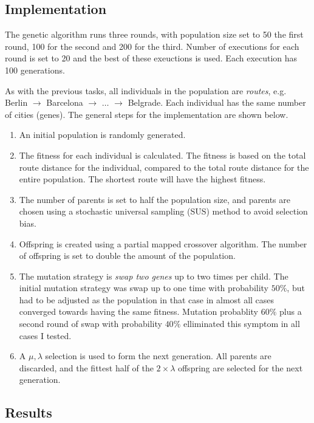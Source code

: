 \documentclass{article}
\begin{document}
\subsection*{Implementation}

The genetic algorithm runs three rounds, with population size set to 50 the first round, 100 for the second and 200 for the third. Number of executions for each round is set to 20 and the best of these exeuctions is used. Each execution has 100 generations.

As with the previous tasks, all individuals in the population are \textit{routes}, e.g. Berlin $\rightarrow$ Barcelona $\rightarrow$ $\ldots$ $\rightarrow$ Belgrade. Each individual has the same number of cities (genes). The general steps for the implementation are shown below.

\begin{enumerate}
    \item An initial population is randomly generated.
    \item The fitness for each individual is calculated. The fitness is based on the total route distance for the individual, compared to the total route distance for the entire population. The shortest route will have the highest fitness.
    \item The number of parents is set to half the population size, and parents are chosen using a stochastic universal sampling (SUS) method to avoid selection bias.
    \item Offspring is created using a partial mapped crossover algorithm. The number of offspring is set to double the amount of the population.
    \item The mutation strategy is \textit{swap two genes} up to two times per child. The initial mutation strategy was swap up to one time with probability $50\%$, but had to be adjusted as the population in that case in almost all cases converged towards having the same fitness. Mutation probablity $60\%$ plus a second round of swap with probability $40\%$ elliminated this symptom in all cases I tested.
    \item A $\mu,\lambda$ selection is used to form the next generation. All parents are discarded, and the fittest half of the $2 \times \lambda$ offspring are selected for the next generation.
\end{enumerate}

\subsection*{Results}
\end{document}
